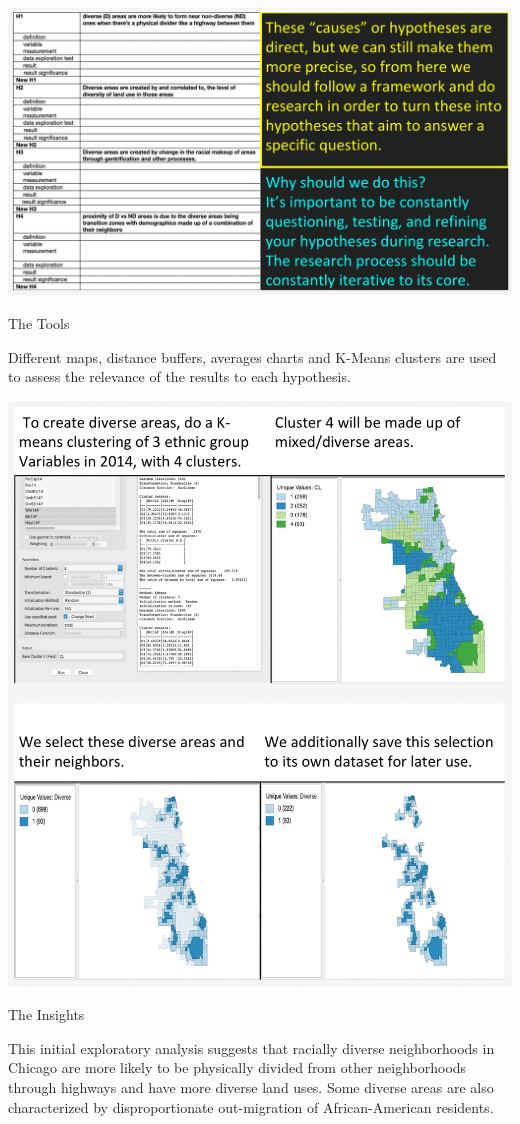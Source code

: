 \documentclass[
]{book}
\begin{document}
\includegraphics{images/racialdiversity3.png}

The Tools

Different maps, distance buffers, averages charts and K-Means clusters are used to assess the relevance of the results to each hypothesis.

\includegraphics{images/racialdiversity4.png}

The Insights

This initial exploratory analysis suggests that racially diverse neighborhoods in Chicago are more likely to be physically divided from other neighborhoods through highways and have more diverse land uses. Some diverse areas are also characterized by disproportionate out-migration of African-American residents.
\end{document}
